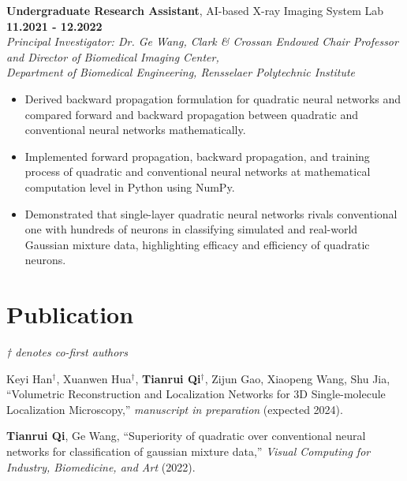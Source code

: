 \documentclass[letterpaper, 10pt]{article}
\newcommand{\subsectionvspace}{\vspace{6pt}}
\begin{document}
    \subsectionvspace

    \textbf{Undergraduate Research Assistant}, 
    AI-based X-ray Imaging System Lab \hfill \textbf{11.2021 - 12.2022} \\
    \textit{
        Principal Investigator: Dr. Ge Wang, 
        Clark \& Crossan Endowed Chair Professor and Director of Biomedical Imaging Center, \\
        Department of Biomedical Engineering, 
        Rensselaer Polytechnic Institute
    }
    \begin{itemize}
        \item Derived backward propagation formulation for quadratic neural networks and compared forward and backward propagation between quadratic and conventional neural networks mathematically. 
        \item Implemented forward propagation, backward propagation, and training process of quadratic and conventional neural networks at mathematical computation level in Python using NumPy.
        \item Demonstrated that single-layer quadratic neural networks rivals conventional one with hundreds of neurons in classifying simulated and real-world Gaussian mixture data, highlighting efficacy and efficiency of quadratic neurons.
    \end{itemize}


\section{Publication}


    \textit{† denotes co-first authors}

    \subsectionvspace

    Keyi Han$^\dag$, Xuanwen Hua$^\dag$, \textbf{Tianrui Qi}$^\dag$, Zijun Gao, Xiaopeng Wang, Shu Jia, ``Volumetric Reconstruction and Localization Networks for 3D Single-molecule Localization Microscopy,'' \textit{manuscript in preparation} (expected 2024).

    \subsectionvspace

    \textbf{Tianrui Qi}, Ge Wang, ``Superiority of quadratic over conventional neural networks for classification of gaussian mixture data,'' \textit{Visual Computing for Industry, Biomedicine, and Art} (2022).
\end{document}
